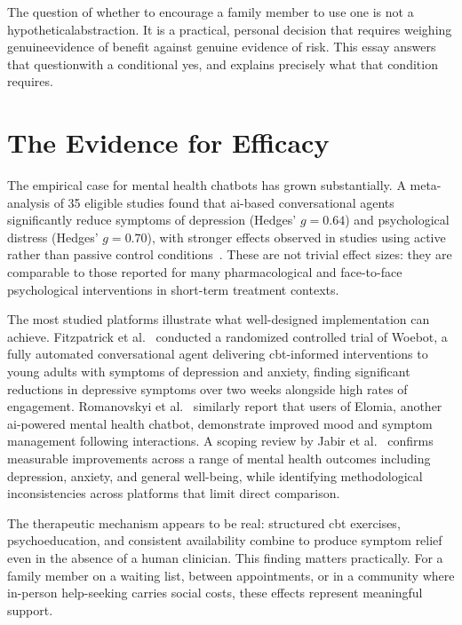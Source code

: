 \documentclass[11pt,showkeys]{essay}
\begin{document}
The question of whether to encourage a family member to use one is not a hypotheticalabstraction. It is a practical, personal decision that requires weighing genuineevidence of benefit against genuine evidence of risk. This essay answers that questionwith a conditional yes, and explains precisely what that condition requires.

\section{The Evidence for Efficacy}

The empirical case for mental health chatbots has grown substantially. A meta-analysis of 35 eligible studies found that \gls{ai}-based conversational agents significantly reduce symptoms of depression (Hedges' $g = 0.64$) and psychological distress (Hedges' $g = 0.70$), with stronger effects observed in studies using active rather than passive control conditions~\cite{li_systematic_2023}. These are not trivial effect sizes: they are comparable to those reported for many pharmacological and face-to-face psychological interventions in short-term treatment contexts.

The most studied platforms illustrate what well-designed implementation can achieve. Fitzpatrick et al.~\cite{fitzpatrick_delivering_2017} conducted a randomized controlled trial of Woebot, a fully automated conversational agent delivering \gls{cbt}-informed interventions to young adults with symptoms of depression and anxiety, finding significant reductions in depressive symptoms over two weeks alongside high rates of engagement. Romanovskyi et al.~\cite{romanovskyi_elomia_2021} similarly report that users of Elomia, another \gls{ai}-powered mental health chatbot, demonstrate improved mood and symptom management following interactions. A scoping review by Jabir et al.~\cite{jabir_evaluating_2023} confirms measurable improvements across a range of mental health outcomes including depression, anxiety, and general well-being, while identifying methodological inconsistencies across platforms that limit direct comparison.

The therapeutic mechanism appears to be real: structured \gls{cbt} exercises, psychoeducation, and consistent availability combine to produce symptom relief even in the absence of a human clinician. This finding matters practically. For a family member on a waiting list, between appointments, or in a community where in-person help-seeking carries social costs, these effects represent meaningful support.
\end{document}
